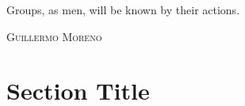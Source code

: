 \epigraph{Groups, as men, will be known by their actions.}%
{\textsc{Guillermo Moreno}}
\null\vfill
\newpage
\blankpagewithnumber
\section{Section Title}
\lipsum[1]
\newpage
\blankpagewithnumber